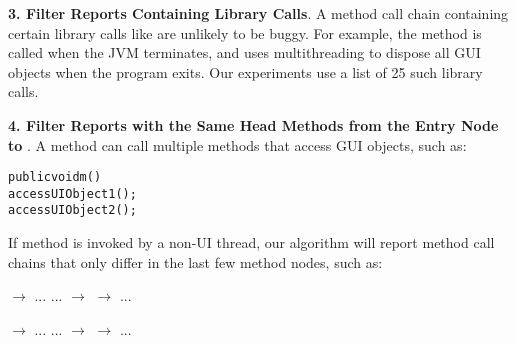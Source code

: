 



\textbf{3. Filter Reports Containing Library Calls}. A
method call chain containing certain library calls
like  are unlikely to
be buggy. For example, the 
method is called when the JVM terminates, and uses multithreading
to dispose all GUI objects when the program exits.
Our experiments use a list of 25 such library calls.

\textbf{4. Filter Reports with the Same Head Methods from the Entry Node to }. A method can call
multiple methods that access GUI objects, such as:

\pagebreak[3]
\vspace{-2mm}                   %
\begin{CodeOut}
\begin{alltt}
     public void m() \ttlcb
         accessUIObject1();
         accessUIObject2();
     \ttrcb
\end{alltt}
\end{CodeOut}
\vspace{-2mm}
If method  is invoked by a non-UI thread, our algorithm will
report method call chains that
only differ in the last few method nodes, such as:

 $\rightarrow$ ... ... $\rightarrow$  $\rightarrow$  ...

 $\rightarrow$ ... ... $\rightarrow$  $\rightarrow$  ...

